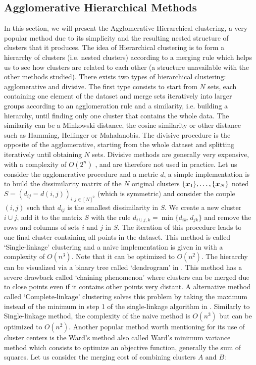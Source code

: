 \subsection{Agglomerative Hierarchical Methods}
In this section, we will present the Agglomerative Hierarchical clustering, a very popular method due to its simplicity and the resulting nested structure of clusters that it produces. The idea of Hierarchical clustering is to form a hierarchy of clusters (i.e. nested clusters) according to a merging rule which helps us to see how clusters are related to each other (a structure unavailable with the other methods studied). There exists two types of hierarchical clustering: agglomerative and divisive. The first type consists to start from $N$ sets, each containing one element of the dataset and merge sets iteratively into larger groups according to an agglomeration rule and a similarity, i.e. building a hierarchy, until finding only one cluster that contains the whole data. The similarity can be a Minkowski distance, the cosine similarity or other distance such as Hamming, Hellinger or Mahalanobis.  The divisive procedure is the opposite of the agglomerative, starting from the whole dataset and splitting iteratively until obtaining $N$ sets. Divisive methods are generally very expensive, with a complexity of $O(2^n)$ \citep{Guenoche1991} , and are therefore not used in practice. 
Let us consider the agglomerative procedure and a metric $d$, a simple implementation is to build the dissimilarity matrix of the $N$ original clusters $\{\boldsymbol x_1\},\dots,\{\boldsymbol x_N\}$ noted $S=(d_{ij}=d(i,j))_{i,j\in [N]^2}$ (which is symmetric) and consider the couple $(i,j)$ such that $d_{ij}$ is the smallest dissimilarity in $S$. We create a new cluster $i \cup j$, add it to the matrix $S$ with the rule $d_{i\cup j, k}=\min\{d_{ik},d_{jk}\}$ and remove the rows and columns of sets $i$ and $j$ in $S$. The iteration of this procedure leads to one final cluster containing all points in the dataset. This method is called `Single-linkage' clustering \citep{Graham:1985:HMS:1435654.1436662} and a naive implementation is given in  with a complexity of $O(n^3)$. Note that it can be optimized to $O(n^2)$\citep{hierarchicalMurtagh}. The hierarchy can be visualized via a binary tree called `dendrogram' in . This method has a severe drawback called `chaining phenomenon' where clusters can be merged due to close points even if it contains other points very distant. A alternative method called `Complete-linkage' clustering solves this problem by taking the maximum instead of the minimum in step 1 of the single-linkage algorithm in . Similarly to Single-linkage method, the complexity of the naive method is $O(n^3)$ but can be optimized to $O(n^2)$. Another popular method worth mentioning for its use of cluster centers is the Ward's method\citep{ward63} also called Ward's minimum variance method which consists to optimize an objective function, generally the sum of squares. Let us consider the merging cost of combining clusters $A$ and $B$:
